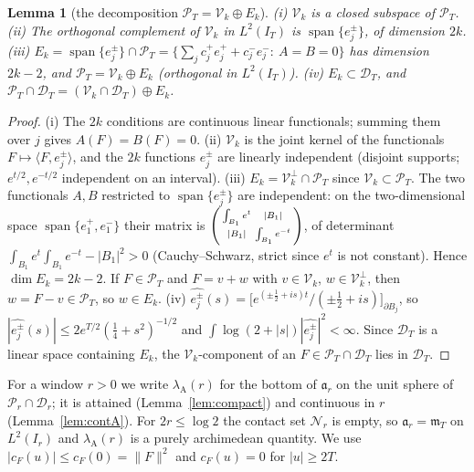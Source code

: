 \documentclass[11pt]{amsart}
\newtheorem{lemma}[theorem]{Lemma}
\theoremstyle{definition}
\theoremstyle{remark}
\newcommand{\PT}{\mathcal P_T}
\newcommand{\IT}{I_T}
\newcommand{\cF}{c_F}
\newcommand{\mT}{\mathfrak m_T}
\begin{document}
\begin{lemma}[the decomposition $\PT=\mathcal V_k\oplus E_k$]\label{lem:coer-decomp}
\emph{(i)} $\mathcal V_k$ is a closed subspace of $\PT$. \emph{(ii)} The orthogonal complement of
$\mathcal V_k$ in $L^2(\IT)$ is $\operatorname{span}\{e_j^\pm\}$, of dimension $2k$.
\emph{(iii)} $E_k=\operatorname{span}\{e_j^\pm\}\cap\PT=\{\sum_jc_j^+e_j^++c_j^-e_j^-:\ A=B=0\}$ has
dimension $2k-2$, and $\PT=\mathcal V_k\oplus E_k$ (orthogonal in $L^2(\IT)$).
\emph{(iv)} $E_k\subset\mathcal D_T$, and $\PT\cap\mathcal D_T=(\mathcal V_k\cap\mathcal D_T)\oplus E_k$.
\end{lemma}
\begin{proof}
(i) The $2k$ conditions are continuous linear functionals; summing them over $j$ gives $A(F)=B(F)=0$.
(ii) $\mathcal V_k$ is the joint kernel of the functionals $F\mapsto\langle F,e_j^\pm\rangle$, and the $2k$
functions $e_j^\pm$ are linearly independent (disjoint supports; $e^{t/2},e^{-t/2}$ independent on an
interval). (iii) $E_k=\mathcal V_k^\perp\cap\PT$ since $\mathcal V_k\subset\PT$. The two functionals
$A,B$ restricted to $\operatorname{span}\{e_j^\pm\}$ are independent: on the two-dimensional space
$\operatorname{span}\{e_1^+,e_1^-\}$ their matrix is
$\begin{psmallmatrix}\int_{B_1}e^t&|B_1|\\|B_1|&\int_{B_1}e^{-t}\end{psmallmatrix}$, of determinant
$\int_{B_1}e^t\int_{B_1}e^{-t}-|B_1|^2>0$ (Cauchy--Schwarz, strict since $e^t$ is not constant). Hence
$\dim E_k=2k-2$. If $F\in\PT$ and $F=v+w$ with $v\in\mathcal V_k$, $w\in\mathcal V_k^\perp$, then
$w=F-v\in\PT$, so $w\in E_k$. (iv) $\widehat{e_j^\pm}(s)=\big[e^{(\pm\frac12+is)t}/(\pm\frac12+is)\big]_{\partial B_j}$,
so $|\widehat{e_j^\pm}(s)|\le2e^{T/2}(\frac14+s^2)^{-1/2}$ and $\int\log(2+|s|)|\widehat{e_j^\pm}|^2<\infty$.
Since $\mathcal D_T$ is a linear space containing $E_k$, the $\mathcal V_k$-component of an $F\in\PT\cap\mathcal D_T$
lies in $\mathcal D_T$.
\end{proof}

For a window $r>0$ we write $\lambda_{\mathrm A}(r)$ for the bottom of $\mathfrak a_r$ on the unit sphere of
$\mathcal P_r\cap\mathcal D_r$; it is attained (Lemma~\ref{lem:compact}) and continuous in $r$ (Lemma~\ref{lem:contA}).
For $2r\le\log2$ the contact set $\mathcal N_r$ is empty, so $\mathfrak a_r=\mT$ on $L^2(I_r)$ and $\lambda_{\mathrm A}(r)$ is a
purely archimedean quantity. We use $|\cF(u)|\le\cF(0)=\|F\|^2$ and $\cF(u)=0$ for $|u|\ge2T$.
\end{document}
